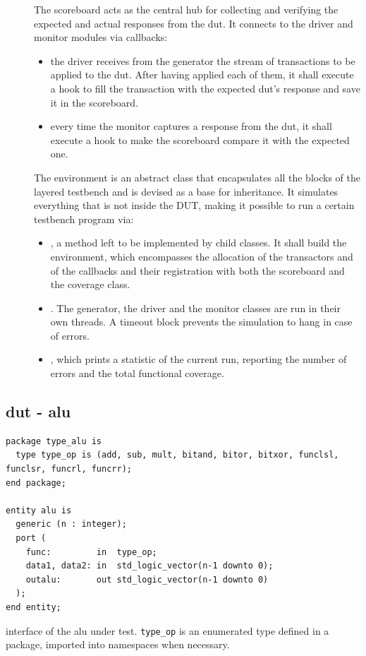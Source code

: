 \begin{description}
    \item[] The scoreboard acts as the central hub for collecting and verifying the expected and actual responses from the \ac{dut}. It connects to the driver and monitor modules via callbacks:
    \begin{itemize}
        \item the driver receives from the generator the stream of transactions to be applied to the \ac{dut}. After having applied each of them, it shall execute a hook to fill the transaction with the expected \ac{dut}'s response and save it in the scoreboard.
        \item every time the monitor captures a response from the \ac{dut}, it shall execute a hook to make the scoreboard compare it with the expected one.
    \end{itemize}
    \item[] The environment is an abstract class that encapsulates all the blocks of the layered testbench and is devised as a base for inheritance. It simulates everything that is not inside the DUT, making it possible to run a certain testbench program via: 
    \begin{itemize}
        \item {}, a method left to be implemented by child classes. It shall build the environment, which encompasses the allocation of the transactors and of the callbacks and their registration with both the scoreboard and the coverage class.
        \item {}. The generator, the driver and the monitor classes are run in their own threads. A timeout block prevents the simulation to hang in case of errors.
        \item {}, which prints a statistic of the current run, reporting the number of errors and the total functional coverage.
    \end{itemize}
\end{description}

\subsection{\acs{dut} - \acl{alu}}\label{subsec:dut_alu}

\begin{listing}
\begin{verbatim}
package type_alu is
  type type_op is (add, sub, mult, bitand, bitor, bitxor, funclsl, funclsr, funcrl, funcrr);
end package;

entity alu is
  generic (n : integer);
  port ( 
    func:         in  type_op;
    data1, data2: in  std_logic_vector(n-1 downto 0);
    outalu:       out std_logic_vector(n-1 downto 0)
  );
end entity;
\end{verbatim}
\caption{\vhdl interface of the \ac{alu} under test. \texttt{type_op} is an enumerated type defined in a \vhdl package, imported into \sv namespaces when necessary.}
\label{list:dut_alu}
\end{listing}

